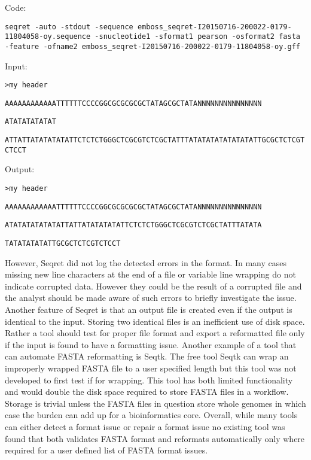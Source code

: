 Code:

\verb|seqret -auto -stdout -sequence emboss_seqret-I20150716-200022-0179-11804058-oy.sequence -snucleotide1 -sformat1 pearson -osformat2 fasta -feature -ofname2 emboss_seqret-I20150716-200022-0179-11804058-oy.gff|

Input:

\verb|>my header|

\verb|AAAAAAAAAAAATTTTTTCCCCGGCGCGCGCGCTATAGCGCTATANNNNNNNNNNNNNNN|

\verb|ATATATATATAT|

\verb|ATTATTATATATATATTCTCTCTGGGCTCGCGTCTCGCTATTTATATATATATATATATTGCGCTCTCGTCTCCT|

Output:

\verb|>my header|

\verb|AAAAAAAAAAAATTTTTTCCCCGGCGCGCGCGCTATAGCGCTATANNNNNNNNNNNNNNN|

\verb|ATATATATATATATTATTATATATATATTCTCTCTGGGCTCGCGTCTCGCTATTTATATA|

\verb|TATATATATATTGCGCTCTCGTCTCCT|

However, Seqret did not log the detected errors in the format. In many cases missing new line characters at the end of a file or variable line wrapping do not indicate corrupted data. However they could be the result of a corrupted file and the analyst should be made aware of such errors to briefly investigate the issue. Another feature of Seqret is that an output file is created even if the output is identical to the input. Storing two identical files is an inefficient use of disk space. Rather a tool should test for proper file format and export a reformatted file only if the input is found to have a formatting issue. Another example of a tool that can automate FASTA reformatting is Seqtk. The free tool Seqtk can wrap an improperly wrapped FASTA file to a user specified length but this tool was not developed to first test if for wrapping. This tool has both limited functionality and would double the disk space required to store FASTA files in a workflow. Storage is trivial unless the FASTA files in question store whole genomes in which case the burden can add up for a bioinformatics core. Overall, while many tools can either detect a format issue or repair a format issue no existing tool was found that both validates FASTA format and reformats automatically only where required for a user defined list of FASTA format issues.

  
  
  
  
  
  
  
  
  
  
  
  
  
  
  
  
  
  
  
  
  
  